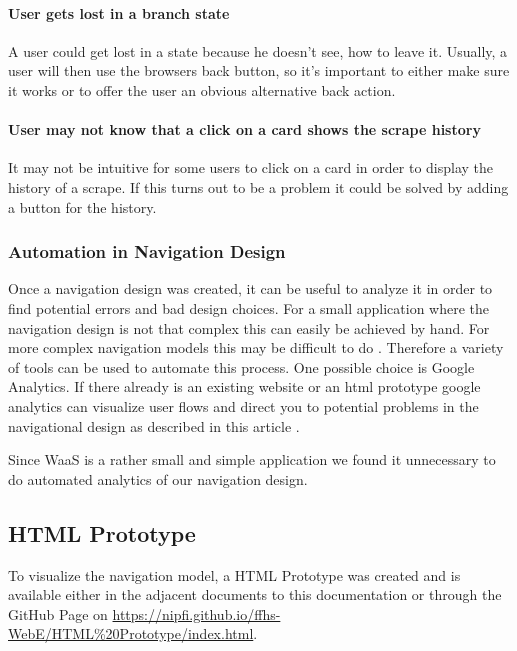 \documentclass[titlepage, 12pt]{article}
\begin{document}
\paragraph{User gets lost in a branch state}
A user could get lost in a state because he doesn't see, how to leave it. Usually, a user will then use the browsers back button, so it's important to either make sure it works or to offer the user an obvious alternative back action.

\paragraph{User may not know that a click on a card shows the scrape history}
It may not be intuitive for some users to click on a card in order to display the history of a scrape. If this turns out to be a problem it could be solved by adding a button for the history.

\subsubsection{Automation in Navigation Design}

Once a navigation design was created, it can be useful to analyze it in order to find potential errors and bad design choices. For a small application where the navigation design is not that complex this can easily be achieved by hand. For more complex navigation models this may be difficult to do \cite{mSharonHurleyHall2019}. Therefore a variety of tools can be used to automate this process. One possible choice is Google Analytics. If there already is an existing website or an html prototype google analytics can visualize user flows and direct you to potential problems in the navigational design as described in this article \cite{mAndyCrestodina2018}.

Since WaaS is a rather small and simple application we found it unnecessary to do automated analytics of our navigation design.

\subsection{HTML Prototype}
To visualize the navigation model, a HTML Prototype was created and is available either in the adjacent documents to this documentation or through the GitHub Page on \url{https://nipfi.github.io/ffhs-WebE/HTML%20Prototype/index.html}.

\pagebreak

\listoftables
\listoffigures

\pagebreak



\end{document}
